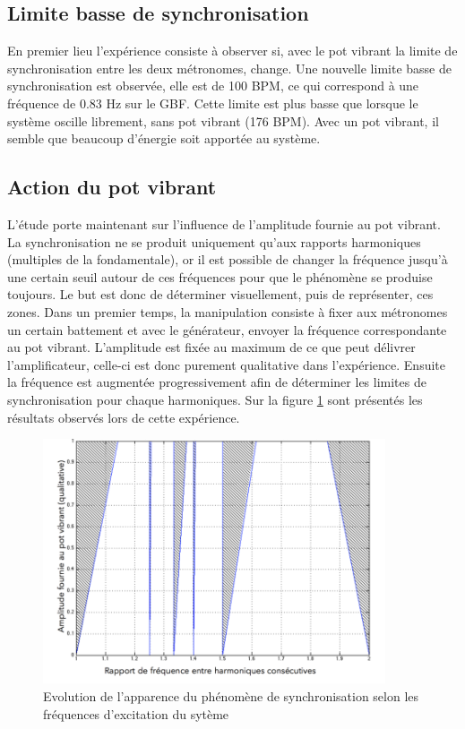 \documentclass[a4paper,11pt]{report}
\begin{document}
\subsection{Limite basse de synchronisation}
En premier lieu l'expérience consiste à observer si, avec le pot vibrant la limite de synchronisation entre les deux métronomes, change. Une nouvelle limite basse de synchronisation est observée, elle est de 100 BPM, ce qui correspond à une fréquence de 0.83 Hz sur le GBF. Cette limite est plus basse que lorsque le système oscille librement, sans pot vibrant (176 BPM). Avec un pot vibrant, il semble que beaucoup d'énergie soit apportée au système.

\subsection{Action du pot vibrant}
L'étude porte maintenant sur l'influence de l'amplitude fournie au pot vibrant. La synchronisation ne se produit uniquement qu'aux rapports harmoniques (multiples de la fondamentale), or il est possible de changer la fréquence jusqu'à une certain seuil autour de ces fréquences pour que le phénomène se produise toujours. Le but est donc de déterminer visuellement, puis de représenter, ces zones. Dans un premier temps, la manipulation consiste à fixer aux métronomes un certain battement et avec le générateur, envoyer la fréquence correspondante au pot vibrant. L'amplitude est fixée au maximum de ce que peut délivrer l'amplificateur, celle-ci est donc purement qualitative dans l'expérience. Ensuite la fréquence est augmentée progressivement afin de déterminer les limites de synchronisation pour chaque harmoniques. Sur la figure \ref{ArnoldE} sont présentés les résultats observés lors de cette expérience.
\begin{figure}[h]
\centering
\includegraphics[width=0.9\textwidth]{Arnold_tongues_exp_trait}
\caption{Evolution de l'apparence du phénomène de synchronisation selon les fréquences d'excitation du sytème}\label{ArnoldE}
\end{figure}\\
\end{document}
